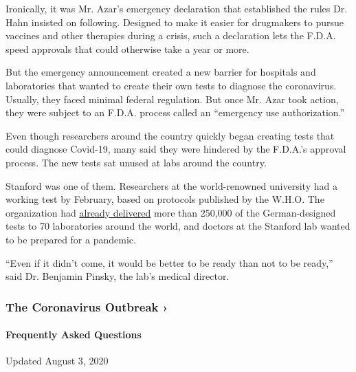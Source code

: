 Ironically, it was Mr. Azar's emergency declaration that established the
rules Dr. Hahn insisted on following. Designed to make it easier for
drugmakers to pursue vaccines and other therapies during a crisis, such
a declaration lets the F.D.A. speed approvals that could otherwise take
a year or more.

But the emergency announcement created a new barrier for hospitals and
laboratories that wanted to create their own tests to diagnose the
coronavirus. Usually, they faced minimal federal regulation. But once
Mr. Azar took action, they were subject to an F.D.A. process called an
``emergency use authorization.''

Even though researchers around the country quickly began creating tests
that could diagnose Covid-19, many said they were hindered by the
F.D.A.'s approval process. The new tests sat unused at labs around the
country.

Stanford was one of them. Researchers at the world-renowned university
had a working test by February, based on protocols published by the
W.H.O. The organization had
\href{https://www.who.int/dg/speeches/detail/who-director-general-s-opening-remarks-at-the-media-briefing-on-2019-novel-coronavirus}{already
delivered} more than 250,000 of the German-designed tests to 70
laboratories around the world, and doctors at the Stanford lab wanted to
be prepared for a pandemic.

``Even if it didn't come, it would be better to be ready than not to be
ready,'' said Dr. Benjamin Pinsky, the lab's medical director.

\href{https://www.nytimes3xbfgragh.onion/news-event/coronavirus?action=click\&pgtype=Article\&state=default\&region=MAIN_CONTENT_3\&context=storylines_faq}{}

\hypertarget{the-coronavirus-outbreak-}{%
\subsubsection{The Coronavirus Outbreak
›}\label{the-coronavirus-outbreak-}}

\hypertarget{frequently-asked-questions}{%
\paragraph{Frequently Asked
Questions}\label{frequently-asked-questions}}

Updated August 3, 2020

